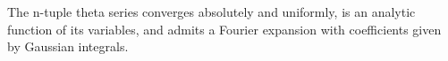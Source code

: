 The n-tuple theta series converges absolutely and uniformly, is an analytic function of its variables, and admits a Fourier expansion with coefficients given by Gaussian integrals.
